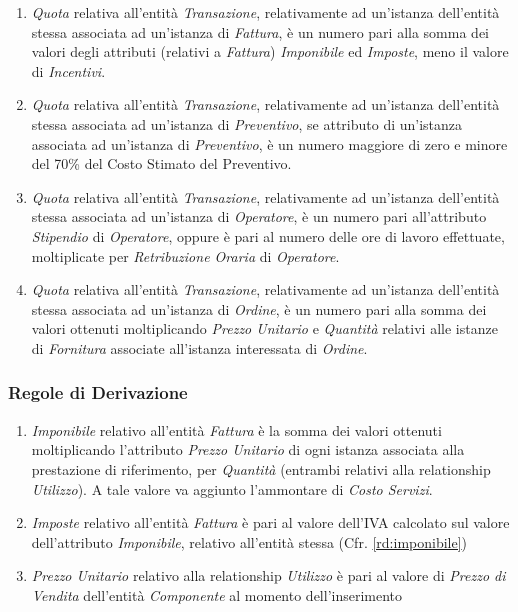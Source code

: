 \begin{enumerate}
				\item \emph{Quota} relativa all'entità \emph{Transazione}, relativamente ad un'istanza dell'entità stessa associata ad un'istanza di \emph{Fattura}, è un numero pari alla somma dei valori degli attributi (relativi a \emph{Fattura}) \emph{Imponibile} ed \emph{Imposte}, meno il valore di \emph{Incentivi}.
				\item \emph{Quota} relativa all'entità \emph{Transazione}, relativamente ad un'istanza dell'entità stessa associata ad un'istanza di \emph{Preventivo}, se attributo di un'istanza associata ad un'istanza di \emph{Preventivo}, è un numero maggiore di zero e minore del 70\% del Costo Stimato del Preventivo.
				\item \emph{Quota} relativa all'entità \emph{Transazione}, relativamente ad un'istanza dell'entità stessa associata ad un'istanza di \emph{Operatore}, è un numero pari all'attributo \emph{Stipendio} di \emph{Operatore}, oppure è pari al numero delle ore di lavoro effettuate, moltiplicate per \emph{Retribuzione Oraria} di \emph{Operatore}.
				\item \emph{Quota} relativa all'entità \emph{Transazione}, relativamente ad un'istanza dell'entità stessa associata ad un'istanza di \emph{Ordine}, è un numero pari alla somma dei valori ottenuti moltiplicando \emph{Prezzo Unitario} e \emph{Quantità} relativi alle istanze di \emph{Fornitura} associate all'istanza interessata di \emph{Ordine}.

			\end{enumerate}
		
		\subsubsection{Regole di Derivazione}
		
			\begin{enumerate}

				\item \label{rd:imponibile} \emph{Imponibile} relativo all'entità \emph{Fattura} è la somma dei valori ottenuti moltiplicando l'attributo \emph{Prezzo Unitario} di ogni istanza associata alla prestazione di riferimento, per \emph{Quantità} (entrambi relativi alla relationship \emph{Utilizzo}). A tale valore va aggiunto l'ammontare di \emph{Costo Servizi}.

				\item \label{rd:imposte} \emph{Imposte} relativo all'entità \emph{Fattura} è pari al valore dell'IVA calcolato sul valore dell'attributo \emph{Imponibile}, relativo all'entità stessa (Cfr. \ref{rd:imponibile})

				\item \label{rd:prezzo_unitario} \emph{Prezzo Unitario} relativo alla relationship \emph{Utilizzo} è pari al valore di \emph{Prezzo di Vendita} dell'entità \emph{Componente} al momento dell'inserimento
				
			\end{enumerate}
